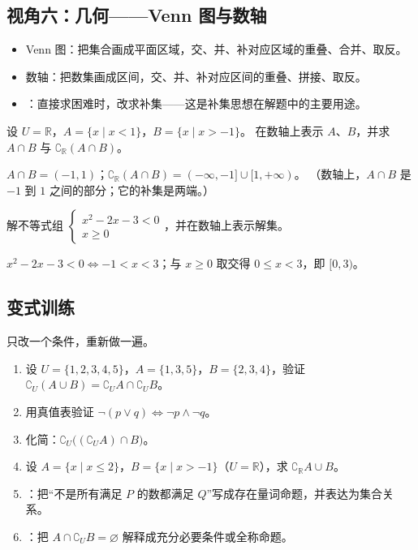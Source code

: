 \begin{explore}
\subsection{视角六：几何——Venn 图与数轴}

\begin{itemize}
  \item Venn 图：把集合画成平面区域，交、并、补对应区域的重叠、合并、取反。
  \item 数轴：把数集画成区间，交、并、补对应区间的重叠、拼接、取反。
  \item {}：直接求困难时，改求补集——这是补集思想在解题中的主要用途。
\end{itemize}

\begin{example}
设 $U=\mathbb{R}$，$A=\{x\mid x<1\}$，$B=\{x\mid x>-1\}$。
在数轴上表示 $A$、$B$，并求 $A\cap B$ 与 $\complement_{\mathbb{R}}(A\cap B)$。
\end{example}
\begin{solution}
$A\cap B=(-1,1)$；$\complement_{\mathbb{R}}(A\cap B)=(-\infty,-1]\cup[1,+\infty)$。
（数轴上，$A\cap B$ 是 $-1$ 到 $1$ 之间的部分；它的补集是两端。）
\end{solution}

\begin{problem}
解不等式组 $\begin{cases}x^2-2x-3<0\\ x\geq0\end{cases}$，并在数轴上表示解集。
\end{problem}
\begin{solution}
$x^2-2x-3<0\iff -1<x<3$；与 $x\geq0$ 取交得 $0\leq x<3$，即 $[0,3)$。
\end{solution}

\end{explore}

\begin{inclasstest}
\subsection{变式训练}
只改一个条件，重新做一遍。
\begin{enumerate}
  \item 设 $U=\{1,2,3,4,5\}$，$A=\{1,3,5\}$，$B=\{2,3,4\}$，验证 $\complement_U(A\cup B)=\complement_U A\cap\complement_U B$。
  \item 用真值表验证 $\neg(p\lor q)\iff\neg p\land\neg q$。
  \item 化简：$\complement_U\big((\complement_U A)\cap B\big)$。
  \item 设 $A=\{x\mid x\leq2\}$，$B=\{x\mid x>-1\}$（$U=\mathbb{R}$），求 $\complement_{\mathbb{R}}A\cup B$。
  \item {}：把“不是所有满足 $P$ 的数都满足 $Q$”写成存在量词命题，并表达为集合关系。
  \item {}：把 $A\cap\complement_U B=\varnothing$ 解释成充分必要条件或全称命题。
\end{enumerate}
\end{inclasstest}

